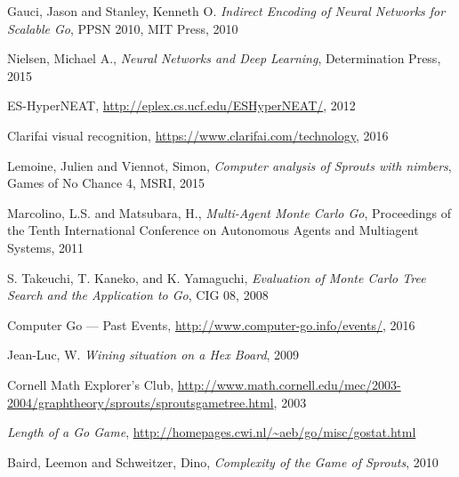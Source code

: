 \documentclass[12pt]{report}
\begin{document}
\begin{thebibliography}{99}
 Gauci, Jason and Stanley, Kenneth O. \emph{Indirect Encoding of Neural Networks for Scalable Go}, PPSN 2010, MIT Press, 2010

 Nielsen, Michael A., \emph{Neural Networks and Deep Learning}, Determination Press, 2015

 ES-HyperNEAT, \url{http://eplex.cs.ucf.edu/ESHyperNEAT/}, 2012

 Clarifai visual recognition, \url{https://www.clarifai.com/technology}, 2016

 Lemoine, Julien and Viennot, Simon, \emph{Computer analysis of Sprouts with nimbers}, Games of No Chance 4, MSRI, 2015

 Marcolino, L.S. and Matsubara, H., \emph{Multi-Agent Monte Carlo Go},  Proceedings of the Tenth International Conference on Autonomous Agents and Multiagent Systems, 2011

 S. Takeuchi, T. Kaneko, and K. Yamaguchi, \emph{Evaluation of Monte Carlo Tree Search and the Application to Go}, CIG 08, 2008

 Computer Go --- Past Events, \url{http://www.computer-go.info/events/}, 2016

 Jean-Luc, W. \emph{Wining situation on a Hex Board}, 2009

 Cornell Math Explorer's Club, \url{http://www.math.cornell.edu/mec/2003-2004/graphtheory/sprouts/sproutsgametree.html}, 2003

 \emph{Length of a Go Game}, \url{http://homepages.cwi.nl/~aeb/go/misc/gostat.html}

 Baird, Leemon and Schweitzer, Dino, \emph{Complexity of the Game of Sprouts}, 2010

\end{thebibliography}

%



% 

\end{document}
